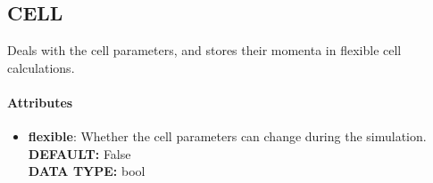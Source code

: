 \subsection{CELL}
\label{CELL}
Deals with the cell parameters, and stores their momenta in flexible cell calculations.
\paragraph{Attributes}
 \begin{itemize}
\item {\bf flexible}:
 Whether the cell parameters can change during the simulation.
{\\ \bf DEFAULT: }False
{\\ \bf DATA TYPE: }bool
\end{itemize}
 

